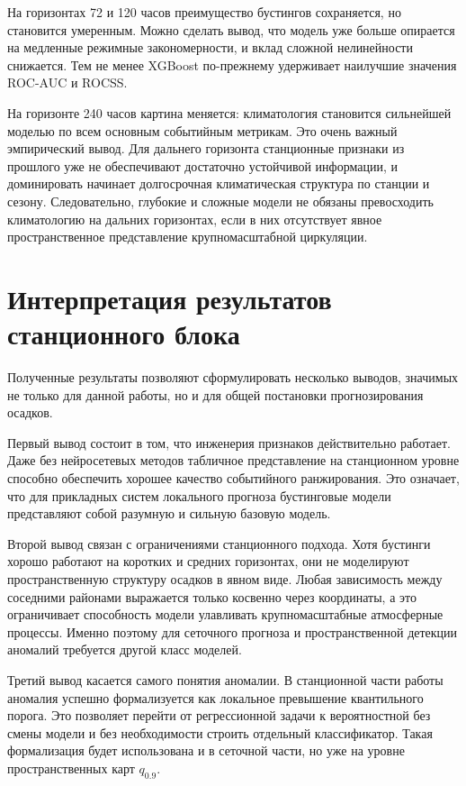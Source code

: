 На горизонтах 72 и 120 часов преимущество бустингов сохраняется, но становится умеренным. Можно сделать вывод, что модель уже больше опирается на медленные режимные закономерности, и вклад сложной нелинейности снижается. Тем не менее XGBoost по-прежнему удерживает наилучшие значения ROC-AUC и ROCSS.

На горизонте 240 часов картина меняется: климатология становится сильнейшей моделью по всем основным событийным метрикам. Это очень важный эмпирический вывод. Для дальнего горизонта станционные признаки из прошлого уже не обеспечивают достаточно устойчивой информации, и доминировать начинает долгосрочная климатическая структура по станции и сезону. Следовательно, глубокие и сложные модели не обязаны превосходить климатологию на дальних горизонтах, если в них отсутствует явное пространственное представление крупномасштабной циркуляции.

\section{Интерпретация результатов станционного блока}

Полученные результаты позволяют сформулировать несколько выводов, значимых не только для данной работы, но и для общей постановки прогнозирования осадков.

Первый вывод состоит в том, что инженерия признаков действительно работает. Даже без нейросетевых методов табличное представление на станционном уровне способно обеспечить хорошее качество событийного ранжирования. Это означает, что для прикладных систем локального прогноза бустинговые модели представляют собой разумную и сильную базовую модель.

Второй вывод связан с ограничениями станционного подхода. Хотя бустинги хорошо работают на коротких и средних горизонтах, они не моделируют пространственную структуру осадков в явном виде. Любая зависимость между соседними районами выражается только косвенно через координаты, а это ограничивает способность модели улавливать крупномасштабные атмосферные процессы. Именно поэтому для сеточного прогноза и пространственной детекции аномалий требуется другой класс моделей.

Третий вывод касается самого понятия аномалии. В станционной части работы аномалия успешно формализуется как локальное превышение квантильного порога. Это позволяет перейти от регрессионной задачи к вероятностной без смены модели и без необходимости строить отдельный классификатор. Такая формализация будет использована и в сеточной части, но уже на уровне пространственных карт \(q_{0.9}\).


